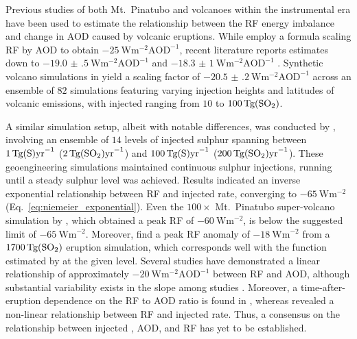 \documentclass[draft]{agujournal2019}
\begin{document}
Previous studies of both Mt.\ Pinatubo \cite{mills2017,hansen2005} and volcanoes within
the instrumental era \cite{gregory2016} have been used to estimate the relationship
between the RF energy imbalance and change in AOD caused by volcanic eruptions. While
 employ a formula scaling RF by AOD to obtain
\(\SI{-25}{\watt\metre^{-2}\mathrm{AOD}^{-1}}\), recent literature reports estimates
down to \(\SI{-19.0(5)}{\watt\metre^{-2}\mathrm{AOD}^{-1}}\) \cite{gregory2016} and
\(\SI{-18.3(10)}{\watt\metre^{-2}\mathrm{AOD}^{-1}}\) \cite{mills2017}. Synthetic
volcano simulations in  yield a scaling factor of
\(\SI{-20.5(2)}{\watt\metre^{-2}\mathrm{AOD}^{-1}}\) across an ensemble of \(82\)
simulations featuring varying injection heights and latitudes of volcanic emissions,
with injected  ranging from \(10\) to \(\SI{100}{\tera\gram(\ce{SO2})}\).

A similar simulation setup, albeit with notable differences, was conducted by
, involving an ensemble of \(14\) levels of injected sulphur
spanning between \(\SI{1}{\tera\gram(\ce{S})\mathrm{yr}^{-1}}\)
(\(\SI{2}{\tera\gram(\ce{SO2})\mathrm{yr}^{-1}}\)) and
\(\SI{100}{\tera\gram(\ce{S})\mathrm{yr}^{-1}}\)
(\(\SI{200}{\tera\gram(\ce{SO2})\mathrm{yr}^{-1}}\)). These geoengineering simulations
maintained continuous sulphur injections, running until a steady sulphur level was
achieved. Results indicated an inverse exponential relationship between RF and injected
 rate, converging to \(\SI{-65}{\watt\metre^{-2}}\)
(Eq.~\ref{eq:niemeier_exponential}). Even the \(100\times\) Mt.\ Pinatubo super-volcano
simulation by , which obtained a peak RF of
\(\SI{-60}{\watt\metre^{-2}}\), is below the suggested limit of
\(\SI{-65}{\watt\metre^{-2}}\). Moreover,  find a peak RF anomaly of
\(\SI{-18}{\watt\metre^{-2}}\) from a \(\SI{1700}{\tera\gram(\ce{SO2})}\) eruption
simulation, which corresponds well with the function estimated by 
at the given  level. Several studies have demonstrated a linear relationship of
approximately \(-\SI{20}{\watt\metre^{-2}\mathrm{AOD}^{-1}}\) between RF and AOD,
although substantial variability exists in the slope among studies
\cite{mills2017,hansen2005,gregory2016,marshall2020,pitari2016b}. Moreover, a
time-after-eruption dependence on the RF to AOD ratio is found in ,
whereas  revealed a non-linear relationship between RF and injected
 rate. Thus, a consensus on the relationship between injected , AOD, and
RF has yet to be established.
\end{document}
